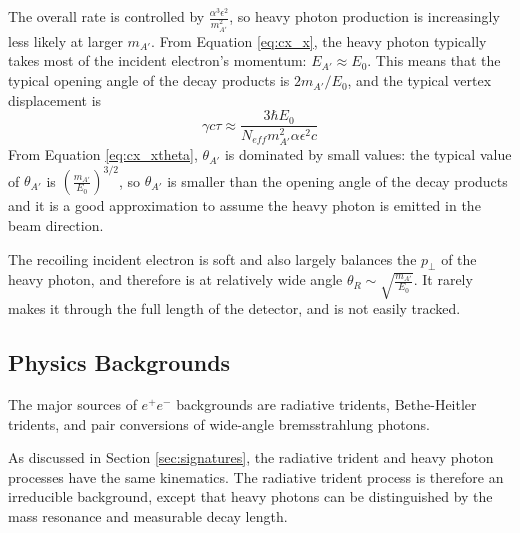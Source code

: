 The overall rate is controlled by $\frac{\alpha^3\epsilon^2}{m_{A'}^2}$, so heavy photon production is increasingly less likely at larger $m_{A'}$.
From Equation \ref{eq:cx_x}, the heavy photon typically takes most of the incident electron's momentum: $E_{A'}\approx E_0$.
This means that the typical opening angle of the decay products is $2m_{A'}/E_0$, and the typical vertex displacement is
\begin{equation}
    \gamma c\tau \approx \frac{3\hbar E_0}{N_{eff}m_{A'}^2\alpha\epsilon^2 c}
\end{equation}
From Equation \ref{eq:cx_xtheta}, $\theta_{A'}$ is dominated by small values: the typical value of $\theta_{A'}$ is $\left(\frac{m_{A'}}{E_0}\right)^{3/2}$, so $\theta_{A'}$ is smaller than the opening angle of the decay products and it is a good approximation to assume the heavy photon is emitted in the beam direction.

The recoiling incident electron is soft and also largely balances the $p_\perp$ of the heavy photon, and therefore is at relatively wide angle $\theta_R\sim \sqrt{\frac{m_{A'}}{E_0}}$.
It rarely makes it through the full length of the detector, and is not easily tracked.

\subsection{Physics Backgrounds}
The major sources of $e^+e^-$ backgrounds are radiative tridents, Bethe-Heitler tridents, and pair conversions of wide-angle bremsstrahlung photons.

As discussed in Section \ref{sec:signatures}, the radiative trident and heavy photon processes have the same kinematics.
The radiative trident process is therefore an irreducible background, except that heavy photons can be distinguished by the mass resonance and measurable decay length.

